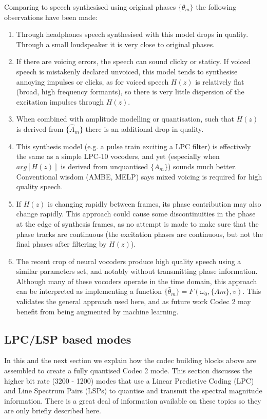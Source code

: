 \documentclass{article}
\begin{document}
{Comparing to speech synthesised using original phases $\{\theta_m\}$ the following observations have been made:
\begin{enumerate}
\item Through headphones speech synthesised with this model drops in quality. Through a small loudspeaker it is very close to original phases.
\item If there are voicing errors, the speech can sound clicky or staticy.  If voiced speech is mistakenly declared unvoiced, this model tends to synthesise annoying impulses or clicks, as for voiced speech $H(z)$ is relatively flat (broad, high frequency formants), so there is very little dispersion of the excitation impulses through $H(z)$.
\item When combined with amplitude modelling or quantisation, such that $H(z)$ is derived from $\{\hat{A}_m\}$ there is an additional drop in quality.
\item This synthesis model (e.g. a pulse train exciting a LPC filter) is effectively the same as a simple LPC-10 vocoders, and yet (especially when $arg[H(z)]$ is derived from unquantised $\{A_m\}$) sounds much better.  Conventional wisdom (AMBE, MELP) says mixed voicing is required for high quality speech.
\item If $H(z)$ is changing rapidly between frames, its phase contribution may also change rapidly. This approach could cause some discontinuities in the phase at the edge of synthesis frames, as no attempt is made to make sure that the phase tracks are continuous (the excitation phases are continuous, but not the final phases after filtering by $H(z)$).
\item The recent crop of neural vocoders produce high quality speech using a similar parameters set, and notably without transmitting phase information.  Although many of these vocoders operate in the time domain, this approach can be interpreted as implementing a function $\{ \hat{\theta}_m\} = F(\omega_0, \{Am\},v)$.  This validates the general approach used here, and as future work Codec 2 may benefit from being augmented by machine learning.
\end{enumerate}

\subsection{LPC/LSP based modes}
\label{sect:mode_lpc_lsp}

In this and the next section we explain how the codec building blocks above are assembled to create a fully quantised Codec 2 mode.  This section discusses the higher bit rate (3200 - 1200) modes that use a Linear Predictive Coding (LPC) and Line Spectrum Pairs (LSPs) to quantise and transmit the spectral magnitude information.  There is a great deal of information available on these topics so they are only briefly described here.

}
\end{document}
